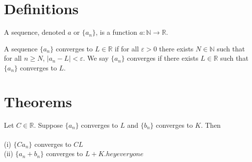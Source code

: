 %

\section{Definitions}

\begin{definition}[Sequence]
  \label{def:sequence}
  A sequence, denoted $a$ or $\{a_n\}$, is a function $a : ℕ → \mathbb{R}$.
\end{definition}

\begin{definition}[Convergence]
  \label{def:convergence}
  \leanok

  A sequence $\{a_n\}$ converges to $L ∈ \mathbb{R}$ if for all $\varepsilon > 0$ there exists
  $N ∈ ℕ$ such that for all $n ≥ N$, $|a_n - L| < \varepsilon$.
  We say $\{a_n\}$ converges if there exists $L ∈ \mathbb{R}$ such that $\{a_n\}$ converges to $L$.

\end{definition}


\section{Theorems}


\begin{theorem}
  \label{thm:limit_laws}

  Let $C \in \mathbb{R}$. Suppose $\{a_n\}$ converges to $L$ and $\{b_n\}$ converges to $K$. Then \\ \\
  (i) $\{C a_n\}$ converges to $C L$ \\
  (ii) $\{a_n + b_n\}$ converges to $L + K. hey everyone$ 

\end{theorem}
